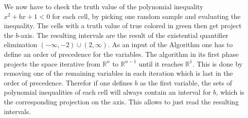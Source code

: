 We now have to check the truth value of the polynomial inequality $x^2 + bx + 1 < 0$ for each cell, by picking one random sample and evaluating the
inequality.
The cells with a truth value of true colored in green then get project the $b$-axis.
The resulting intervals are the result of the existential quantifier elimination $(-\infty, -2) \cup (2, \infty)$.
As an input of the Algorithm one has to define an order of precedence for the variables.
The algorithm in its first phase projects the space iterative from $\mathbb{R}^n$ to $\mathbb{R}^{n-1}$ until it reaches $\mathbb{R}^1$.
This is done by removing one of the remaining variables in each iteration which is last in the order of precedence.
Therefor if one defines $b$ as the first variable, the sets of polynomial inequalities of each cell will always contain an interval for $b$, which is
the corresponding projection on the axis.
This allows to just read the resulting intervals.


